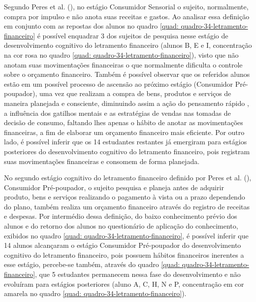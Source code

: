 Segundo Peres et al. (\citeyear{peres2019}), no estágio Consumidor Sensorial o sujeito, normalmente, compra por impulso e não anota suas receitas e gastos. Ao analisar essa definição em conjunto com as repostas dos alunos no quadro \ref{quad: quadro-34-letramento-financeiro} é possível enquadrar 3 dos sujeitos de pesquisa nesse estágio de desenvolvimento cognitivo do letramento financeiro (alunos B, E e I, concentração na cor rosa no quadro \ref{quad: quadro-34-letramento-financeiro}), visto que não anotam suas movimentações financeiras o que normalmente dificulta o controle sobre o orçamento financeiro. Também é possível observar que os referidos alunos estão em um possível processo de ascensão ao próximo estágio (Consumidor Pré-poupador), uma vez que realizam a compra de bens, produtos e serviços de maneira planejada e consciente, diminuindo assim a ação do pensamento rápido \cite{kahneman2012}, a influência dos gatilhos mentais e as estratégias de vendas \cite{cialdini2012} nas tomadas de decisão de consumo, faltando lhes apenas o hábito de anotar as movimentações financeiras, a fim de elaborar um orçamento financeiro mais eficiente. Por outro lado, é possível inferir que os 14 estudantes restantes já emergiram para estágios posteriores do desenvolvimento cognitivo do letramento financeiro, pois registram suas movimentações financeiras e consomem de forma planejada.

No segundo estágio cognitivo do letramento financeiro definido por Peres et al. (\citeyear{peres2019}), Consumidor Pré-poupador, o sujeito pesquisa e planeja antes de adquirir produto, bens e serviços realizando o pagamento à vista ou a prazo dependendo do plano, também realiza um orçamento financeiro através do registro de receitas e despesas. Por intermédio dessa definição, do baixo conhecimento prévio dos alunos e do retorno dos alunos no questionário de aplicação do conhecimento, exibidos no quadro \ref{quad: quadro-34-letramento-financeiro}, é possível inferir que 14 alunos alcançaram o estágio Consumidor Pré-poupador do desenvolvimento cognitivo do letramento financeiro, pois possuem hábitos financeiros inerentes a esse estágio, percebe-se também, através do quadro \ref{quad: quadro-34-letramento-financeiro}, que 5 estudantes permanecem nessa fase do desenvolvimento e não evoluíram para estágios posteriores (aluno A, C, H, N e P, concentração em cor amarela no quadro \ref{quad: quadro-34-letramento-financeiro}).

